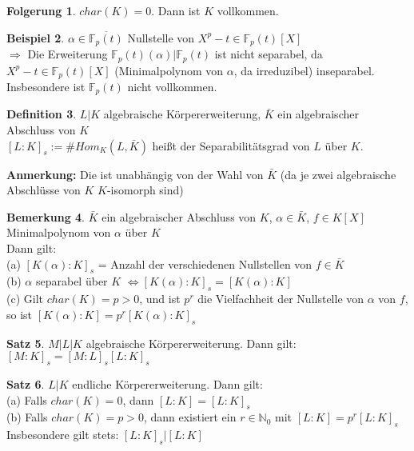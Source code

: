 \documentclass[10pt,a4paper,numbers=endperiod]{scrreprt}
\theoremstyle{definition}
\newtheorem{satz}{Satz}[section]
\newtheorem{defi}[satz]{Definition}
\newtheorem{bem}[satz]{Bemerkung}
\newtheorem{bsp}[satz]{Beispiel}
\newtheorem{folg}[satz]{Folgerung}
\def\NN{{\mathbb N}}
\def\FF{{\mathbb F}}
\begin{document}
\begin{folg}
	$char(K) = 0$. Dann ist $K$ vollkommen.
\end{folg}

\begin{bsp}
	$\alpha \in \overline{\FF_p(t)}$ Nullstelle von $X^p-t \in \FF_p(t)[X]$\\
	$\Rightarrow$ Die Erweiterung $\FF_p(t)(\alpha)|\FF_p(t)$ ist nicht separabel, da $X^p-t \in \FF_p(t)[X]$ (Minimalpolynom von $\alpha$, da irreduzibel) inseparabel. Insbesondere ist $\FF_p(t)$ nicht vollkommen.
\end{bsp}

\begin{defi}
	$L|K$ algebraische Körpererweiterung, $\bar{K}$ ein algebraischer Abschluss von $K$\\
	$[L:K]_s := \# Hom_K(L, \bar{K})$ heißt der Separabilitätsgrad von $L$ über $K$.
\end{defi}

\textbf{Anmerkung:} Die ist unabhängig von der Wahl von $\bar{K}$ (da je zwei algebraische Abschlüsse von $K$ $K$-isomorph sind)

\begin{bem}
	$\bar{K}$ ein algebraischer Abschluss von $K$, $\alpha \in \bar{K}$, $f \in K[X]$ Minimalpolynom von $\alpha$ über $K$\\
	Dann gilt:\\
	(a) $[K(\alpha):K]_s$ = Anzahl der verschiedenen Nullstellen von $f \in \bar{K}$\\
	(b) $\alpha$ separabel über $K$ $\Leftrightarrow [K(\alpha): K]_s = [K(\alpha):K]$\\ 
	(c) Gilt $char(K) = p > 0$, und ist $p^r$ die Vielfachheit der Nullstelle von $\alpha$ von $f$, so ist $[K(\alpha):K] = p^r[K(\alpha):K]_s$
\end{bem}

\begin{satz}
	$M|L|K$ algebraische Körpererweiterung. Dann gilt:\\
	$[M:K]_s = [M:L]_s [L:K]_s$
\end{satz}

\begin{satz}
	$L|K$ endliche Körpererweiterung. Dann gilt:\\
	(a) Falls $char(K) = 0$, dann $[L:K] = [L:K]_s$\\
	(b) Falls $char(K) = p > 0$, dann existiert ein $r \in \NN_0$ mit $[L:K] = p^r[L:K]_s$\\
	Insbesondere gilt stets: $[L:K]_s|[L:K]$
\end{satz}
\end{document}
